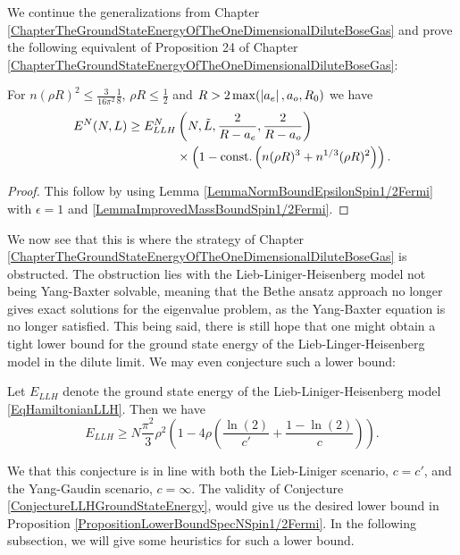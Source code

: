 We continue the generalizations from Chapter \ref{ChapterTheGroundStateEnergyOfTheOneDimensionalDiluteBoseGas} and prove the following equivalent of Proposition 24 of Chapter \ref{ChapterTheGroundStateEnergyOfTheOneDimensionalDiluteBoseGas}:
\begin{proposition}
	\label{PropositionLowerBoundSpecNSpin1/2Fermi}
	For $ n(\rho R)^2\leq  \frac{3}{16\pi^2}\frac{1}{8} $, $ \rho R\leq \frac{1}{2} $ and $ R>2\max(\left\lvert a_e \right\rvert,a_o,R_0) $ we have \begin{equation}
	\begin{aligned}
	E^N(N,L)\geq E_{LLH}^N&\left(N,\tilde{L},\frac{2}{R-a_e},\frac{2}{R-a_o}\right)\\&\times\left(1-\textnormal{const.}\left(n(\rho R)^3+n^{1/3}(\rho R)^2\right)\right).
	\end{aligned}
	\end{equation}
\end{proposition}
\begin{proof}
	This follow by using Lemma \ref{LemmaNormBoundEpsilonSpin1/2Fermi} with $ \epsilon=1 $ and \ref{LemmaImprovedMassBoundSpin1/2Fermi}.
\end{proof}
We now see that this is where the strategy of Chapter \ref{ChapterTheGroundStateEnergyOfTheOneDimensionalDiluteBoseGas} is obstructed. The obstruction lies with the Lieb-Liniger-Heisenberg model not being Yang-Baxter solvable, meaning that the Bethe ansatz approach no longer gives exact solutions for the eigenvalue problem, as the Yang-Baxter equation is no longer satisfied. This being said, there is still hope that one might obtain a tight lower bound for the ground state energy of the Lieb-Linger-Heisenberg model in the dilute limit. We may even conjecture such a lower bound:
\begin{conjecture}\label{ConjectureLLHGroundStateEnergy}
	Let $ E_{LLH} $ denote the ground state energy of the Lieb-Liniger-Heisenberg model \eqref{EqHamiltonianLLH}. Then we have \begin{equation}
	E_{LLH}\geq N\frac{\pi^2}{3}\rho^2\left(1-4\rho\left(\frac{\ln(2)}{c'}+\frac{1-\ln(2)}{c}\right) \right).
	\end{equation}
\end{conjecture}
We that this conjecture is in line with both the Lieb-Liniger scenario, $ c=c' $, and the Yang-Gaudin scenario, $ c=\infty $. The validity of Conjecture \ref{ConjectureLLHGroundStateEnergy}, would give us the desired lower bound in Proposition \ref{PropositionLowerBoundSpecNSpin1/2Fermi}.
In the following subsection, we will give some heuristics for such a lower bound.
